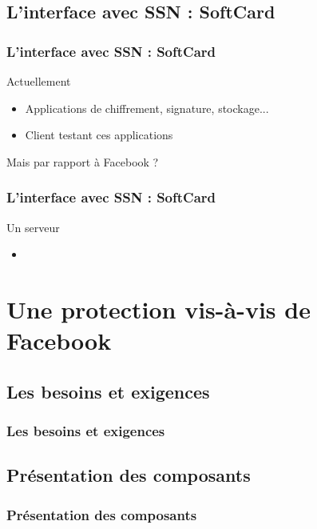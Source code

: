 \documentclass{beamer}
\begin{document}
\subsection{L'interface avec SSN : SoftCard}
\begin{frame}
    \frametitle{L'interface avec SSN : SoftCard}
    \begin{block}{Actuellement}
        \begin{itemize}
            \item Applications de chiffrement, signature, stockage...
            \item Client testant ces applications
        \end{itemize}
    \end{block}

    Mais par rapport à Facebook ?
\end{frame}

\begin{frame}
    \frametitle{L'interface avec SSN : SoftCard}
    \begin{block}{Un serveur}
        \begin{itemize}
            \item 
        \end{itemize}
    \end{block}
\end{frame}

\section{Une protection vis-à-vis de Facebook}

\subsection{Les besoins et exigences}
\begin{frame}
    \frametitle{Les besoins et exigences}
    \begin{block}{ }
    \end{block}
\end{frame}

\subsection{Présentation des composants}
\begin{frame}
    \frametitle{Présentation des composants}
    \begin{block}{ }
    \end{block}
\end{frame}
\end{document}
